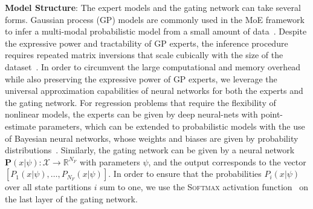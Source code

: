 \textbf{Model Structure}: The expert models and the gating network can take
several forms. 
%
Gaussian process (GP) models are commonly used in the MoE framework to infer a
multi-modal probabilistic model from a small amount of
data~\cite{harkonen2022mixtures}.
%
Despite the expressive power and tractability of GP experts, the inference
procedure requires repeated matrix inversions that scale cubically with the size
of the dataset~\cite{zhang2019embarrassingly}.  
%
%
In order to circumvent the large computational and memory overhead while also
preserving the expressive power of GP experts, we leverage the universal
approximation capabilities of neural networks for both the experts and the
gating network.
%
For regression problems that require the flexibility of nonlinear models, the
experts can be given by deep neural-nets with point-estimate parameters, which
can be extended to probabilistic models with the use of Bayesian neural
networks, whose weights and biases are given by probability
distributions~\cite{jospin2020hands}.
%
Similarly, the gating network can be given by a neural network $\mathbf{P}(x| \psi) :
\mathcal{X} \rightarrow \mathbb{R}^{N_F}$ with parameters $\psi$, and the output
corresponds to the vector $[P_1(x| \psi), \dots, P_{N_F}(x| \psi)]$.
%
In order to ensure that the probabilities $P_i(x | \psi)$ over all state
partitions $i$ sum to one, we use the \textsc{Softmax} activation
function~\cite{sharma2017activation} on the last layer of the gating network.
%

